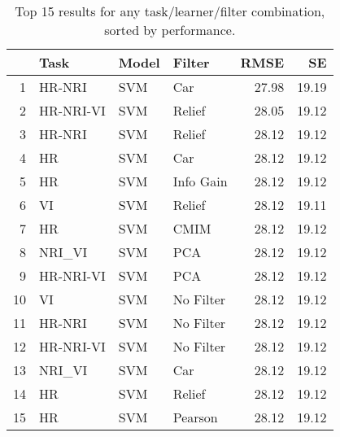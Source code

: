 \begin{table}[ht!]
\centering
\caption{Top 15 results for any task/learner/filter combination, sorted by performance.} 
\label{tab:perf-top-15}
\begin{tabular}{rlllrr}
  \hline
 & Task & Model & Filter & RMSE & SE \\ 
  \hline
1 & HR-NRI & SVM & Car & 27.98 & 19.19 \\ 
  2 & HR-NRI-VI & SVM & Relief & 28.05 & 19.12 \\ 
  3 & HR-NRI & SVM & Relief & 28.12 & 19.12 \\ 
  4 & HR & SVM & Car & 28.12 & 19.12 \\ 
  5 & HR & SVM & Info Gain & 28.12 & 19.12 \\ 
  6 & VI & SVM & Relief & 28.12 & 19.11 \\ 
  7 & HR & SVM & CMIM & 28.12 & 19.12 \\ 
  8 & NRI\_VI & SVM & PCA & 28.12 & 19.12 \\ 
  9 & HR-NRI-VI & SVM & PCA & 28.12 & 19.12 \\ 
  10 & VI & SVM & No Filter & 28.12 & 19.12 \\ 
  11 & HR-NRI & SVM & No Filter & 28.12 & 19.12 \\ 
  12 & HR-NRI-VI & SVM & No Filter & 28.12 & 19.12 \\ 
  13 & NRI\_VI & SVM & Car & 28.12 & 19.12 \\ 
  14 & HR & SVM & Relief & 28.12 & 19.12 \\ 
  15 & HR & SVM & Pearson & 28.12 & 19.12 \\ 
   \hline
\end{tabular}
\end{table}
